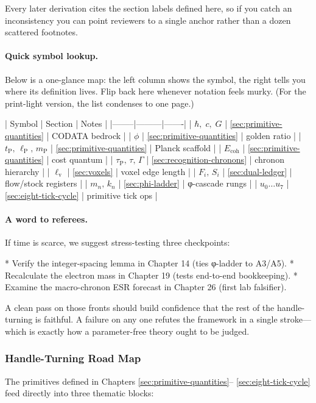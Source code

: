 \documentclass[11pt,oneside]{book}
\begin{document}
Every later derivation cites the section labels defined here, so if you catch
an inconsistency you can point reviewers to a single anchor rather than a
dozen scattered footnotes.

\paragraph{Quick symbol lookup.}  
Below is a one-glance map: the left column shows the symbol, the right tells
you where its definition lives.  Flip back here whenever notation feels murky.
(For the print-light version, the list condenses to one page.)

| Symbol | Section | Notes |
|--------|---------|-------|
| $\hbar,\;c,\;G$ | \ref{sec:primitive-quantities} | CODATA bedrock |
| $\phi$ | \ref{sec:primitive-quantities} | golden ratio |
| $t_{\text{P}},\,\ell_{\text{P}},\,m_{\text{P}}$ | \ref{sec:primitive-quantities} | Planck scaffold |
| $E_{\text{coh}}$ | \ref{sec:primitive-quantities} | cost quantum |
| $\tau_{\text{P}},\,\tau,\,\Gamma$ | \ref{sec:recognition-chronons} | chronon hierarchy |
| $\ell_{\mathrm{v}}$ | \ref{sec:voxels} | voxel edge length |
| $F_{i},\,S_{i}$ | \ref{sec:dual-ledger} | flow/stock registers |
| $m_{n},\,k_{n}$ | \ref{sec:phi-ladder} | φ-cascade rungs |
| $u_{0}\dots u_{7}$ | \ref{sec:eight-tick-cycle} | primitive tick ops |

\paragraph{A word to referees.}  
If time is scarce, we suggest stress-testing three checkpoints:

* Verify the integer-spacing lemma in Chapter 14 (ties φ-ladder to A3/A5).  
* Recalculate the electron mass in Chapter 19 (tests end-to-end bookkeeping).  
* Examine the macro-chronon ESR forecast in Chapter 26 (first lab falsifier).

A clean pass on those fronts should build confidence that the rest of the
handle-turning is faithful.  A failure on any one refutes the framework in a
single stroke—which is exactly how a parameter-free theory ought to be judged.


\subsubsection{Handle-Turning Road Map}
\label{subsubsec:handle-turn}
The primitives defined in Chapters \ref{sec:primitive-quantities}–
\ref{sec:eight-tick-cycle} feed directly into three thematic blocks:
\end{document}

